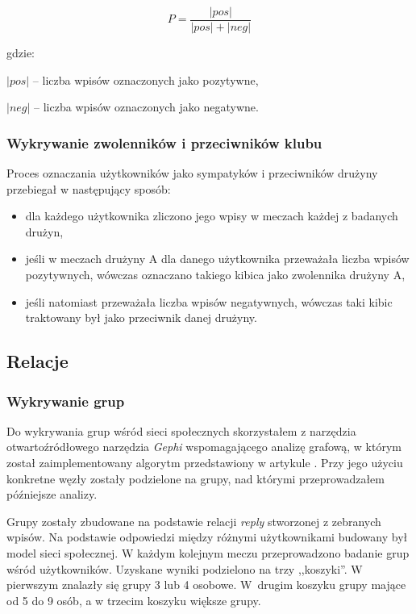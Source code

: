 \begin{equation}
\label{equation:pozytywnosc}
P = \frac{|pos|}{|pos| + |neg|}
\end{equation}

gdzie:

$|pos|$ -- liczba wpisów oznaczonych jako pozytywne,

$|neg|$ -- liczba wpisów oznaczonych jako negatywne.



\subsubsection{Wykrywanie zwolenników i przeciwników klubu}
\label{subsubsection:wykrywaniezwolennikow}

Proces oznaczania użytkowników jako sympatyków i przeciwników drużyny przebiegał
w następujący sposób:
\begin{itemize}
  \item dla każdego użytkownika zliczono jego wpisy w meczach każdej z badanych 
  drużyn,
  \item jeśli w meczach drużyny A dla danego użytkownika przeważała liczba 
  wpisów pozytywnych, wówczas oznaczano takiego kibica jako zwolennika drużyny A,
  \item jeśli natomiast przeważała liczba wpisów negatywnych, wówczas taki kibic
  traktowany był jako przeciwnik danej drużyny.  
\end{itemize} 

\subsection{Relacje}



\subsubsection{Wykrywanie grup}
 \label{subsubsection:koncepcja-wykrywaniegrup}
Do wykrywania grup wśród sieci społecznych skorzystałem z narzędzia
otwartoźródłowego narzędzia \textit{Gephi} wspomagającego analizę grafową, w
którym został zaimplementowany algorytm przedstawiony w artykule
\cite{blondel2008fuc}. Przy jego użyciu konkretne węzły zostały podzielone
na grupy, nad którymi przeprowadzałem późniejsze analizy.

Grupy zostały zbudowane na podstawie relacji \textit{reply}
stworzonej z zebranych wpisów. Na podstawie odpowiedzi między różnymi
użytkownikami budowany był model sieci społecznej.
W każdym kolejnym meczu przeprowadzono badanie grup wśród użytkowników.
Uzyskane wyniki podzielono na trzy ,,koszyki''. W pierwszym znalazły się grupy 
3 lub 4 osobowe. W~drugim koszyku grupy mające od 5 do 9 osób, a w trzecim koszyku
większe grupy. 



